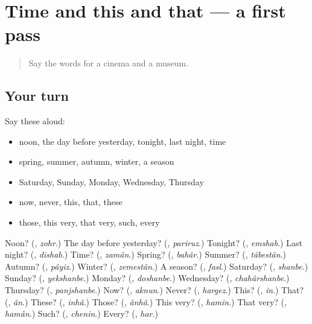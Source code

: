 \section[(dialogue)]{Time and this and that — a first pass}

\label{lesson:FA-R88-first-pass-time-and-this-and-that}



\begin{quote}
Say the words for a cinema and a museum.
\end{quote}

\subsection*{Your turn}
Say these aloud:

\begin{itemize}
\raggedright
  \item noon, the day before yesterday, tonight, last night, time
  \item spring, summer, autumn, winter, a season
  \item Saturday, Sunday, Monday, Wednesday, Thursday
  \item now, never, this, that, these
  \item those, this very, that very, such, every
\end{itemize}

\begin{tcolorbox}[breakable,colback=teal!4,colframe=teal!35!black,title={Before you move on}]
Noon? (\textbf{}, \emph{zohr}.) The day before yesterday? (\textbf{}, \emph{pariruz}.) Tonight? (\textbf{}, \emph{emshab}.) Last night? (\textbf{}, \emph{dishab}.) Time? (\textbf{}, \emph{zamân}.) Spring? (\textbf{}, \emph{bahâr}.) Summer? (\textbf{}, \emph{tâbestân}.) Autumn? (\textbf{}, \emph{pâyiz}.) Winter? (\textbf{}, \emph{zemestân}.) A season? (\textbf{}, \emph{fasl}.) Saturday? (\textbf{}, \emph{shanbe}.) Sunday? (\textbf{}, \emph{yekshanbe}.) Monday? (\textbf{}, \emph{doshanbe}.) Wednesday? (\textbf{}, \emph{chahârshanbe}.) Thursday? (\textbf{}, \emph{panjshanbe}.) Now? (\textbf{}, \emph{aknun}.) Never? (\textbf{}, \emph{hargez}.) This? (\textbf{}, \emph{in}.) That? (\textbf{}, \emph{ân}.) These? (\textbf{}, \emph{inhâ}.) Those? (\textbf{}, \emph{ânhâ}.) This very? (\textbf{}, \emph{hamin}.) That very? (\textbf{}, \emph{hamân}.) Such? (\textbf{}, \emph{chenin}.) Every? (\textbf{}, \emph{har}.)
\end{tcolorbox}
